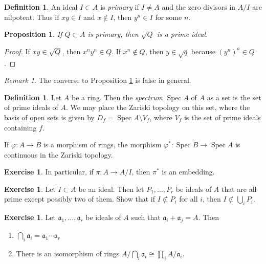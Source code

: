 \documentclass[leqno, openany]{memoir}
\newtheorem{prop}[thm]{Proposition}
\theoremstyle{definition}
\newtheorem{defn}[thm]{Definition}
\newtheorem{exer}[thm]{Exercise}
\theoremstyle{remark}
\newtheorem{rmk}[thm]{Remark}
\theoremstyle{plain}
\theoremstyle{definition}
\theoremstyle{remark}
\newcommand{\mf}[1]{\mathfrak{#1}}
\DeclareMathOperator{\spec}{Spec}
\begin{document}
\begin{defn}
    An ideal $I \subset A$ is \textit{primary} if $I \neq A$ and the zero divisors in $A/I$ are nilpotent. Thus if $xy \in I$ and $x \notin I$, then $y^n \in I$ for some $n$.
\end{defn}

\begin{prop}
    \label{prop:radical_of_primary}
    If $Q \subset A$ is primary, then $\sqrt{Q}$ is a prime ideal.
\end{prop}

\begin{proof}
    If $xy \in \sqrt{Q}$, then $x^ny^n \in Q$. If $x^n \notin Q$, then $y \in \sqrt{q}$ because $(y^n)^a \in Q$.
\end{proof}

\begin{rmk}
    The converse to Proposition \ref{prop:radical_of_primary} is false in general.
\end{rmk}

\begin{defn}
    Let $A$ be a ring. Then the \textit{spectrum} $\spec A$ of $A$ as a set is the set of prime ideals of $A$. We may place the Zariski topology on this set, where the basis of open sets is given by $D_f = \spec A \setminus V_f$, where $V_f$ is the set of prime ideals containing $f$.
\end{defn}

If $\varphi:A \to B$ is a morphism of rings, the morphism $\varphi^*: \spec B \to \spec A$ is continuous in the Zariski topology. 

\begin{exer}
    In particular, if $\pi: A \to A/I$, then $\pi^*$ is an embedding.
\end{exer}

\begin{exer}
    Let $I \subset A$ be an ideal. Then let $P_1, \ldots, P_r$ be ideals of $A$ that are all prime except possibly two of them. Show that if $I \not\subset P_i$ for all $i$, then $I \not\subset \bigcup_i P_i$.
\end{exer}

\begin{exer}
    Let $ \mathfrak{a}_1, \ldots, \mathfrak{a}_r$ be ideals of $A$ such that $ \mathfrak{a}_i + \mathfrak{a}_j = A $. Then 
    \begin{enumerate}
        \item $\bigcap_i \mathfrak{a}_i = \mathfrak{a}_1 \cdots \mathfrak{a}_r$
        \item There is an isomorphism of rings $A/ \bigcap_i \mf{a}_i \cong \prod_i A/\mf{a}_i$.
    \end{enumerate}
\end{exer}
\end{document}
